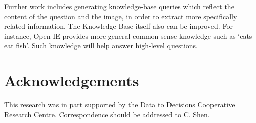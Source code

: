 \documentclass[10pt,journal,compsoc]{IEEEtran}
\begin{document}
Further work includes generating knowledge-base queries which reflect the content of the question and the image, in order to extract more specifically related information. The Knowledge Base itself also can be improved. For instance, Open-IE provides more general common-sense knowledge such as `cats eat fish'. Such knowledge will help answer high-level questions.



\begin{table}[t!]
\centering
\scriptsize
{}
\vspace{-3pt}
\caption{VQA Open-Ended evaluation server results. Accuracies for different answer types and overall performances on the test-standard. We only list the published results before this submission, the whole list of the leanding board can be found from http://www.visualqa.org/roe.html}
\vspace{-12pt}
\label{tab:server_results_2}
\end{table}

\vspace{-7pt}
\section*{Acknowledgements}
This research was in part supported by the Data to Decisions Cooperative Research Centre.
Correspondence should be addressed to C. Shen.
\end{document}
